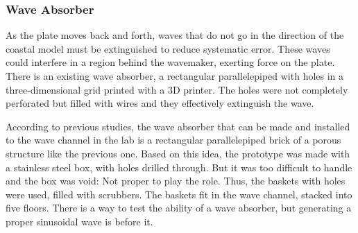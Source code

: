 \subsubsection{Wave Absorber}%

As the plate moves back and forth, waves that do not go in the direction of the coastal model must be extinguished to reduce systematic error. These waves could interfere in a region behind the wavemaker, exerting force on the plate. There is an existing wave absorber, a rectangular parallelepiped with holes in a three-dimensional grid printed with a 3D printer. The holes were not completely perforated but filled with wires and they effectively extinguish the wave.

According to previous studies, the wave absorber that can be made and installed to the wave channel in the lab is a rectangular parallelepiped brick of a porous structure like the previous one. Based on this idea, the prototype was made with a stainless steel box, with holes drilled through. But it was too difficult to handle and the box was void: Not proper to play the role. Thus, the baskets with holes were used, filled with scrubbers. The baskets fit in the wave channel, stacked into five floors. There is a way to test the ability of a wave absorber, but generating a proper sinusoidal wave is before it.

